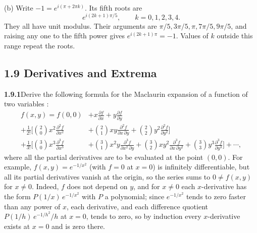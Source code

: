 (b) Write $-1=e^{i(\pi+2\pi k)}$. Its fifth roots are
\[
 \boxed{e^{i(2k+1)\pi/5},\qquad k=0,1,2,3,4}.
\]
They all have unit modulus. Their arguments are $\pi/5,3\pi/5,\pi,
7\pi/5,9\pi/5$, and raising any one to the fifth power gives
$e^{i(2k+1)\pi}=-1$. Values of $k$ outside this range repeat the roots.


\subsection*{1.9 Derivatives and Extrema}

\par\bigskip
\noindent\textbf{1.9.1}\quad Derive the following formula for the Maclaurin
expansion of a function of two variables :
\[
\begin{split}
f(x,y)=f(0,0)&+x\frac{\partial f}{\partial x}+y\frac{\partial f}{\partial y}\\
+\frac{1}{2!}\biggl[\binom{2}{0}x^{2}\frac{\partial^{2}f}{\partial x^{2}}
&+\binom{2}{1}xy\frac{\partial^{2}f}{\partial x\,\partial y}
+\binom{2}{2}y^{2}\frac{\partial^{2}f}{\partial y^{2}}\biggr]\\
+\frac{1}{3!}\biggl[\binom{3}{0}x^{3}\frac{\partial^{3}f}{\partial x^{3}}
&+\binom{3}{1}x^{2}y\frac{\partial^{3}f}{\partial x^{2}\,\partial y}
+\binom{3}{2}xy^{2}\frac{\partial^{3}f}{\partial x\,\partial y^{2}}
+\binom{3}{3}y^{3}\frac{\partial^{3}f}{\partial y^{3}}\biggr]+\cdots,
\end{split}
\]
where all the partial derivatives are to be evaluated at the point $(0,0)$.
\solution
{} For
example, $f(x,y)=e^{-1/x^2}$ (with $f=0$ at $x=0$) is infinitely
differentiable, but all its partial derivatives vanish at the origin,
so the series sums to $0\ne f(x,y)$ for $x\ne0$. Indeed, $f$ does not
depend on $y$, and for $x\ne0$ each $x$-derivative has the form
$P(1/x)\,e^{-1/x^2}$ with $P$ a polynomial; since $e^{-1/x^2}$ tends
to zero faster than any power of $x$, each derivative, and each
difference quotient $P(1/h)\,e^{-1/h^2}/h$ at $x=0$, tends to zero, so
by induction every $x$-derivative exists at $x=0$ and is zero there.

